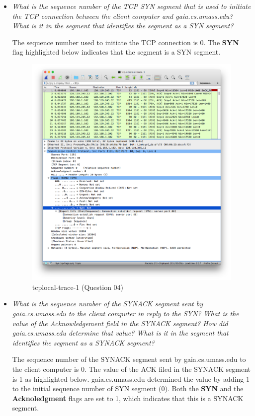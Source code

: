 \documentclass[11pt]{article}
\begin{document}
\begin{itemize}
	\setlength\itemsep{.5cm}

	\item
		\textit{What is the sequence number of the TCP SYN segment that is used to initiate the TCP connection between the client computer and gaia.cs.umass.edu? What is it in the segment that identifies the segment as a SYN segment?}
		\par The sequence number used to initiate the TCP connection is 0. The \textbf{SYN} flag highlighted below indicates that the segment is a SYN segment.
		
		\begin{figure}[H]
		\centering
		\caption{tcplocal-trace-1 (Question 04)}
		\includegraphics[width=400px]{03}
		\end{figure}

	\item
		\textit{What is the sequence number of the SYNACK segment sent by gaia.cs.umass.edu to the client computer in reply to the SYN? What is the value of the Acknowledgement field in the SYNACK segment? How did gaia.cs.umass.edu determine that value? What is it in the segment that identifies the segment as a SYNACK segment?}
		\par The sequence number of the SYNACK segment sent by gaia.cs.umass.edu to the client computer is 0. The value of the ACK filed in the SYNACK segment is 1 as highlighted below. gaia.cs.umass.edu determined the value by adding 1 to the initial sequence number of SYN segment (0). Both the \textbf{SYN} and the \textbf{Acknoledgment} flags are set to 1, which indicates that this is a SYNACK segment.
		

\end{itemize}
\end{document}
